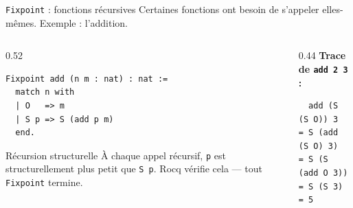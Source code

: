 \documentclass[aspectratio=169]{beamer}
\begin{document}
\begin{frame}[fragile]{\texttt{Fixpoint} : fonctions récursives}
  Certaines fonctions ont besoin de s'appeler elles-mêmes. Exemple : l'addition.

  \begin{columns}
    \begin{column}{0.52\textwidth}
\begin{verbatim}
Fixpoint add (n m : nat) : nat :=
  match n with
  | O   => m
  | S p => S (add p m)
  end.
\end{verbatim}
      \pause
      \begin{alertblock}{Récursion structurelle}
        À chaque appel récursif, \texttt{p} est
        structurellement plus petit que \texttt{S p}.
        Rocq vérifie cela — tout \texttt{Fixpoint} termine.
      \end{alertblock}
    \end{column}
    \begin{column}{0.44\textwidth}
      \textbf{Trace de \texttt{add 2 3} :}
\begin{verbatim}
  add (S (S O)) 3
= S (add (S O) 3)
= S (S (add O 3))
= S (S 3)
= 5
\end{verbatim}
    \end{column}
  \end{columns}
  \pause
\end{frame}
\end{document}
